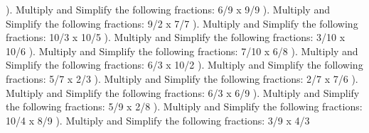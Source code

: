 \documentclass{article}%
\begin{document}
). Multiply and Simplify the following fractions: 6/9 x 9/9%
\newline%
\newline%
). Multiply and Simplify the following fractions: 9/2 x 7/7%
\newline%
\newline%
). Multiply and Simplify the following fractions: 10/3 x 10/5%
\newline%
\newline%
). Multiply and Simplify the following fractions: 3/10 x 10/6%
\newline%
\newline%
). Multiply and Simplify the following fractions: 7/10 x 6/8%
\newline%
\newline%
). Multiply and Simplify the following fractions: 6/3 x 10/2%
\newline%
\newline%
). Multiply and Simplify the following fractions: 5/7 x 2/3%
\newline%
\newline%
). Multiply and Simplify the following fractions: 2/7 x 7/6%
\newline%
\newline%
). Multiply and Simplify the following fractions: 6/3 x 6/9%
\newline%
\newline%
). Multiply and Simplify the following fractions: 5/9 x 2/8%
\newline%
\newline%
). Multiply and Simplify the following fractions: 10/4 x 8/9%
\newline%
\newline%
). Multiply and Simplify the following fractions: 3/9 x 4/3%
\newline%
\newline%
\newline%
\end{document}
